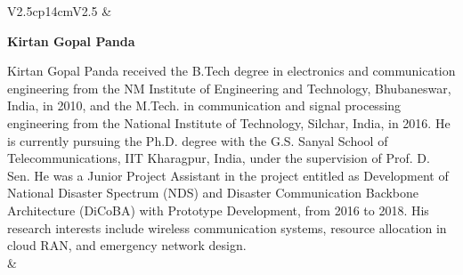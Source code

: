 \begin{tabular}{V{2.5}cp{14cm}V{2.5}}
 & 

\centerline{\large\bf Kirtan Gopal Panda}

\bigskip
Kirtan Gopal Panda received the B.Tech degree in electronics and communication engineering from the NM Institute of Engineering and Technology, Bhubaneswar, India, in 2010, and the M.Tech. in communication and signal processing engineering from the National Institute of Technology, Silchar, India, in 2016. He is currently pursuing the Ph.D. degree with the G.S. Sanyal School of Telecommunications, IIT Kharagpur, India, under the supervision of Prof. D. Sen. He was a Junior Project Assistant in the project entitled as Development of National Disaster Spectrum (NDS) and Disaster Communication Backbone Architecture (DiCoBA) with Prototype Development, from 2016 to 2018. His research interests include wireless communication systems, resource allocation in cloud RAN, and emergency network design.\\
&\\
\end{tabular}

